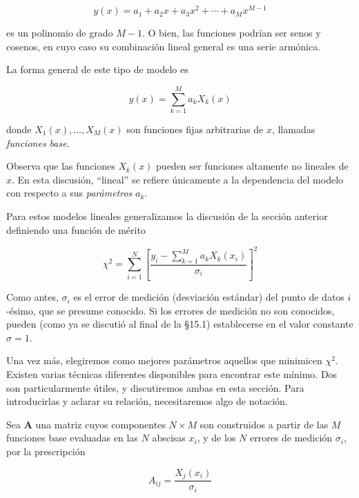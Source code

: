 \documentclass[10pt,a4paper]{book}
\begin{document}
\begin{equation}
y(x) = a_1 + a_2 x + a_3 x^2 + \cdots + a_M x^{M-1}
\tag{15.4.1}
\end{equation}

es un polinomio de grado $M - 1$. O bien, las funciones podrían ser senos y cosenos, en cuyo caso su combinación lineal general es una serie armónica.

La forma general de este tipo de modelo es

\begin{equation}
y(x) = \sum_{k=1}^{M} a_k X_k(x)
\tag{15.4.2}
\end{equation}

donde $X_1(x), \ldots, X_M(x)$ son funciones fijas arbitrarias de $x$, llamadas \textit{funciones base}.

Observa que las funciones $X_k(x)$ pueden ser funciones altamente no lineales de $x$. En esta discusión, “lineal” se refiere únicamente a la dependencia del modelo con respecto a sus \textit{parámetros} $a_k$.

Para estos modelos lineales generalizamos la discusión de la sección anterior definiendo una función de mérito

\begin{equation}
\chi^2 = \sum_{i=1}^{N} \left[ \frac{y_i - \sum_{k=1}^{M} a_k X_k(x_i)}{\sigma_i} \right]^2
\tag{15.4.3}
\end{equation}

Como antes, $\sigma_i$ es el error de medición (desviación estándar) del punto de datos $i$-ésimo, que se presume conocido. Si los errores de medición no son conocidos, pueden (como ya se discutió al final de la §15.1) establecerse en el valor constante $\sigma = 1$.

Una vez más, elegiremos como mejores parámetros aquellos que minimicen $\chi^2$. Existen varias técnicas diferentes disponibles para encontrar este mínimo. Dos son particularmente útiles, y discutiremos ambas en esta sección. Para introducirlas y aclarar su relación, necesitaremos algo de notación.

Sea $\mathbf{A}$ una matriz cuyos componentes $N \times M$ son construidos a partir de las $M$ funciones base evaluadas en las $N$ abscisas $x_i$, y de los $N$ errores de medición $\sigma_i$, por la prescripción

\begin{equation}
A_{ij} = \frac{X_j(x_i)}{\sigma_i}
\tag{15.4.4}
\end{equation}
\end{document}
